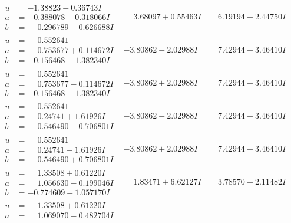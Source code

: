 \documentclass[1p]{elsarticle_modified}
\theoremstyle{definition}
\begin{document}
$$\begin{array}{c|c|c}
\begin{aligned}
u &= -1.38823 - 0.36743 I \\
a &= -0.388078 + 0.318066 I \\
b &= \phantom{-}0.296789 - 0.626688 I\end{aligned}
 & \phantom{-}3.68097 + 0.55463 I & \phantom{-}6.19194 + 2.44750 I \\ \hline\begin{aligned}
u &= \phantom{-}0.552641\phantom{ +0.000000I} \\
a &= \phantom{-}0.753677 + 0.114672 I \\
b &= -0.156468 + 1.382340 I\end{aligned}
 & -3.80862 - 2.02988 I & \phantom{-}7.42944 + 3.46410 I \\ \hline\begin{aligned}
u &= \phantom{-}0.552641\phantom{ +0.000000I} \\
a &= \phantom{-}0.753677 - 0.114672 I \\
b &= -0.156468 - 1.382340 I\end{aligned}
 & -3.80862 + 2.02988 I & \phantom{-}7.42944 - 3.46410 I \\ \hline\begin{aligned}
u &= \phantom{-}0.552641\phantom{ +0.000000I} \\
a &= \phantom{-}0.24741 + 1.61926 I \\
b &= \phantom{-}0.546490 - 0.706801 I\end{aligned}
 & -3.80862 - 2.02988 I & \phantom{-}7.42944 + 3.46410 I \\ \hline\begin{aligned}
u &= \phantom{-}0.552641\phantom{ +0.000000I} \\
a &= \phantom{-}0.24741 - 1.61926 I \\
b &= \phantom{-}0.546490 + 0.706801 I\end{aligned}
 & -3.80862 + 2.02988 I & \phantom{-}7.42944 - 3.46410 I \\ \hline\begin{aligned}
u &= \phantom{-}1.33508 + 0.61220 I \\
a &= \phantom{-}1.056630 - 0.199046 I \\
b &= -0.774609 - 1.057170 I\end{aligned}
 & \phantom{-}1.83471 + 6.62127 I & \phantom{-}3.78570 - 2.11482 I \\ \hline\begin{aligned}
u &= \phantom{-}1.33508 + 0.61220 I \\
a &= \phantom{-}1.069070 - 0.482704 I \\

\end{aligned}
\end{array}$$
\end{document}
